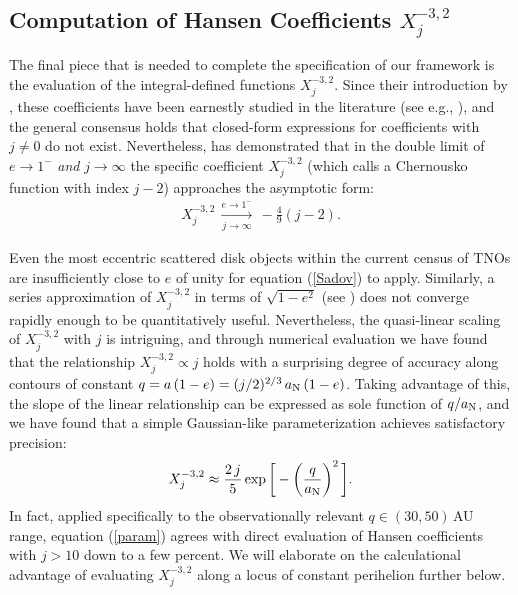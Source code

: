 \documentclass[twocolumn]{aastex62}
\newcommand{\an}{a_{\rm{N}}}
\begin{document}
\subsection{Computation of Hansen Coefficients $X_{j}^{-3,2}$}
The final piece that is needed to complete the specification of our framework is the evaluation of the integral-defined functions $X_{j}^{-3,2}$. Since their introduction by \citet{Hansen1885}, these coefficients have been earnestly studied in the literature (see e.g., \citealt{1970ceme.book.....H,1981CeMec..25..101H, 2008CeMDA.100..287S}), and the general consensus holds that closed-form expressions for coefficients with $j\neq0$ do not exist. Nevertheless, \citet{Sadov2006} has demonstrated that in the double limit of $e\rightarrow1^{-}$ \textit{and} $j\rightarrow\infty$ the specific coefficient $X_{j}^{-3,2}$ (which \citealt{Sadov2006} calls a Chernousko function with index $j-2$) approaches the asymptotic form:
\begin{align}
X_{j}^{-3,2}\,\xrightarrow[j\rightarrow\infty]{e\rightarrow1^{-}}\, -\frac{4}{9}(j-2).
\label{Sadov}
\end{align}

Even the most eccentric scattered disk objects within the current census of TNOs are insufficiently close to $e$ of unity for equation (\ref{Sadov}) to apply. Similarly, a series approximation of $X_{j}^{-3,2}$ in terms of $\sqrt{1-e^2}$ (see \citealt{2008CeMDA.100..287S}) does not converge rapidly enough to be quantitatively useful. Nevertheless, the quasi-linear scaling of $X_{j}^{-3,2}$ with $j$ is intriguing, and through numerical evaluation we have found that the relationship $X_{j}^{-3,2}\propto j$ holds with a surprising degree of accuracy along contours of constant $q=a\,(1-e)=(j/2)^{2/3}\,a_{\rm{N}} \,(1-e)$. Taking advantage of this, the slope of the linear relationship can be expressed as sole function of $q/\an$, and we have found that a simple Gaussian-like parameterization achieves satisfactory precision:
\begin{align}
X_{j}^{-3,2} \approx \frac{2\,j}{5}\exp\bigg[ -\bigg(\frac{q}{a_{\rm{N}}} \bigg)^2\, \bigg].
\label{param}
\end{align}
In fact, applied specifically to the observationally relevant $q\in(30,50)\,$AU range, equation (\ref{param}) agrees with direct evaluation of Hansen coefficients with $j>10$ down to a few percent. We will elaborate on the calculational advantage of evaluating $X_{j}^{-3,2}$ along a locus of constant perihelion further below.
\end{document}

